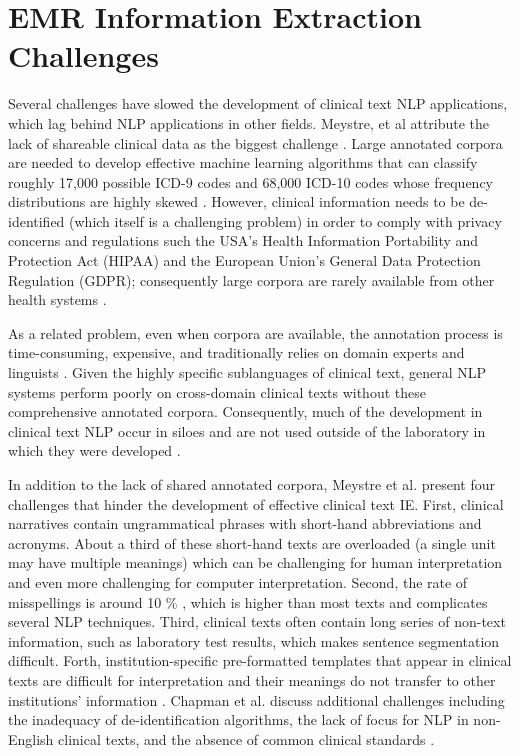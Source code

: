 \documentclass[sigconf]{acmart}
\begin{document}
\section{EMR Information Extraction Challenges}
Several challenges have slowed the development of clinical text NLP applications, which lag behind NLP applications in other fields\cite{chapman2011overcoming}. Meystre, et al attribute the lack of shareable clinical data as the biggest challenge \cite{meystre2008extracting}. Large annotated corpora are needed to develop effective machine learning algorithms that can classify roughly 17,000 possible ICD-9 codes and 68,000 ICD-10 codes whose frequency distributions are highly skewed \cite{berndorfer2017automated}. However, clinical information needs to be de-identified (which itself is a challenging problem) in order to comply with privacy concerns and regulations such the USA's Health Information Portability and Protection Act (HIPAA) and the European Union's General Data Protection Regulation (GDPR); consequently large corpora are rarely available from other health systems \cite{meystre2008extracting}\cite{stanfill2010systematic}.

As a related problem, even when corpora are available, the annotation process is time-consuming, expensive, and traditionally relies on domain experts and linguists  \cite{meystre2008extracting}\cite{velupillai2015recent}. Given the highly specific sublanguages of clinical text, general NLP systems perform poorly on cross-domain clinical texts without these comprehensive annotated corpora. Consequently, much of the development in clinical text NLP occur in siloes and are not used outside of the laboratory in which they were developed \cite{chapman2011overcoming}.

In addition to the lack of shared annotated corpora, Meystre et al. present four challenges that hinder the development of effective clinical text IE. First, clinical narratives contain ungrammatical phrases with short-hand abbreviations and acronyms. About a third of these short-hand texts are overloaded (a single unit may have multiple meanings) which can be challenging for human interpretation and even more challenging for computer interpretation. Second, the rate of misspellings is around 10 \% \cite{ruch2003using}, which is higher than most texts and complicates several NLP techniques. Third, clinical texts often contain long series of non-text information, such as laboratory test results, which makes sentence segmentation difficult. Forth, institution-specific pre-formatted templates that appear in clinical texts are difficult for interpretation and their meanings do not transfer to other institutions' information \cite{meystre2008extracting}. Chapman et al. discuss additional challenges including the inadequacy of de-identification algorithms, the lack of focus for NLP in non-English clinical texts, and the absence of common clinical standards \cite{chapman2011overcoming}.
\end{document}
